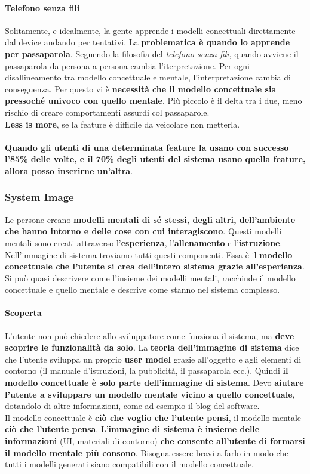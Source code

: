 \documentclass[10pt]{article}
\begin{document}
\paragraph{Telefono senza fili} Solitamente, e idealmente, la gente apprende i modelli concettuali direttamente dal device andando per tentativi. La \textbf{problematica è quando lo apprende per passaparola}. Seguendo la filosofia del \textit{telefono senza fili}, quando avviene il passaparola da persona a persona cambia l'iterpretazione. Per ogni disallineamento tra modello concettuale e mentale, l'interpretazione cambia di conseguenza. Per questo vi è \textbf{necessità che il modello concettuale sia pressoché univoco con quello mentale}. Più piccolo è il delta tra i due, meno rischio di creare comportamenti assurdi col passaparole.\\
\textbf{Less is more}, se la feature è difficile da veicolare non metterla.\\\\
\textbf{Quando gli utenti di una determinata feature la usano con successo l'85\% delle volte, e il 70\% degli utenti del sistema usano quella feature, allora posso inserirne un'altra}.
\subsubsection{System Image}
Le persone creano \textbf{modelli mentali di sé stessi, degli altri, dell'ambiente che hanno intorno e delle cose con cui interagiscono}. Questi modelli mentali sono creati attraverso l'\textbf{esperienza}, l'\textbf{allenamento} e l'\textbf{istruzione}.\\
Nell'immagine di sistema troviamo tutti questi componenti. Essa è il \textbf{modello concettuale che l'utente si crea dell'intero sistema grazie all'esperienza}. Si può quasi descrivere come l'insieme dei modelli mentali, racchiude il modello concettuale e quello mentale e descrive come stanno nel sistema complesso.
\paragraph{Scoperta} L'utente non può chiedere allo sviluppatore come funziona il sistema, ma \textbf{deve scoprire le funzionalità da solo}. La \textbf{teoria dell'immagine di sistema} dice che l'utente sviluppa un proprio \textbf{user model} grazie all'oggetto e agli elementi di contorno (il manuale d'istruzioni, la pubblicità, il passaparola ecc.). Quindi \textbf{il modello concettuale è solo parte dell'immagine di sistema}. Devo \textbf{aiutare l'utente a sviluppare un modello mentale vicino a quello concettuale}, dotandolo di altre informazioni, come ad esempio il blog del software.\\
Il modello concettuale è \textbf{ciò che voglio che l'utente pensi}, il modello mentale \textbf{ciò che l'utente pensa}. L'\textbf{immagine di sistema è insieme delle informazioni} (UI, materiali di contorno) \textbf{che consente all'utente di formarsi il modello mentale più consono}. Bisogna essere bravi a farlo in modo che tutti i modelli generati siano compatibili con il modello concettuale.
\end{document}
